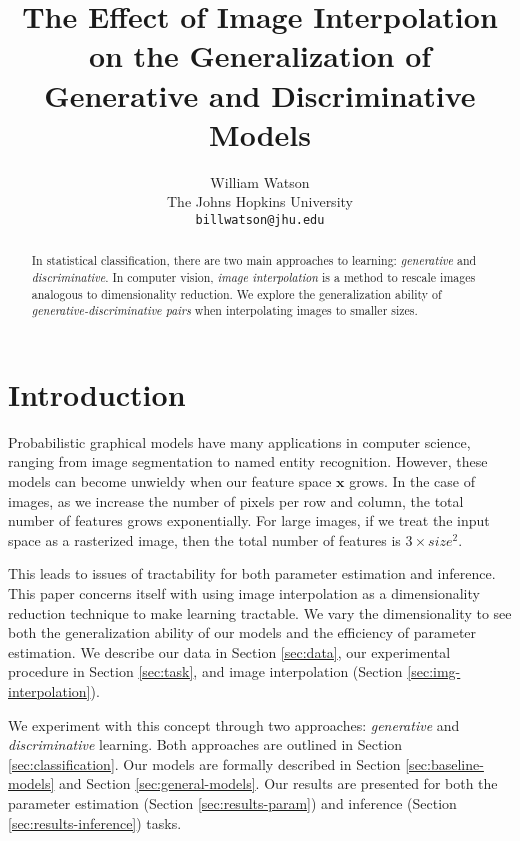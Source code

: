 \documentclass{article}
\title{The Effect of Image Interpolation on the Generalization of Generative and Discriminative Models}
\author{%
  William Watson \\
  The Johns Hopkins University\\
  \texttt{billwatson@jhu.edu} \\
}
\begin{document}

\maketitle

\begin{abstract}
  In statistical classification, there are two main approaches to learning:
  \textit{generative} and \textit{discriminative}. In computer vision,
  \textit{image interpolation} is a method to rescale images analogous to
  dimensionality reduction. We explore the generalization ability of
  \textit{generative-discriminative pairs} when interpolating images to smaller
  sizes.
\end{abstract}



\section{Introduction}
\label{sec:intro}
Probabilistic graphical models have many applications in computer science,
ranging from image segmentation to named entity recognition. However, these
models can become unwieldy when our feature space $\mathbf{x}$ grows. In the
case of images, as we increase the number of pixels per row and column, the
total number of features grows exponentially. For large images, if we treat
the input space as a rasterized image, then the total number of features is
$3 \times size^{2}$.

This leads to issues of tractability for both parameter estimation and
inference. This paper concerns itself with using image interpolation as
a dimensionality reduction technique to make learning tractable. We vary the
dimensionality to see both the generalization ability of our models and the
efficiency of parameter estimation. We describe our data in Section \ref{sec:data},
our experimental procedure in Section \ref{sec:task}, and image interpolation
(Section \ref{sec:img-interpolation}).

We experiment with this concept through two approaches: \textit{generative}
and \textit{discriminative} learning. Both approaches are outlined in Section
\ref{sec:classification}. Our models are formally described in Section
\ref{sec:baseline-models} and Section \ref{sec:general-models}. Our results
are presented for both the parameter estimation (Section \ref{sec:results-param})
and inference (Section \ref{sec:results-inference}) tasks.
\end{document}
